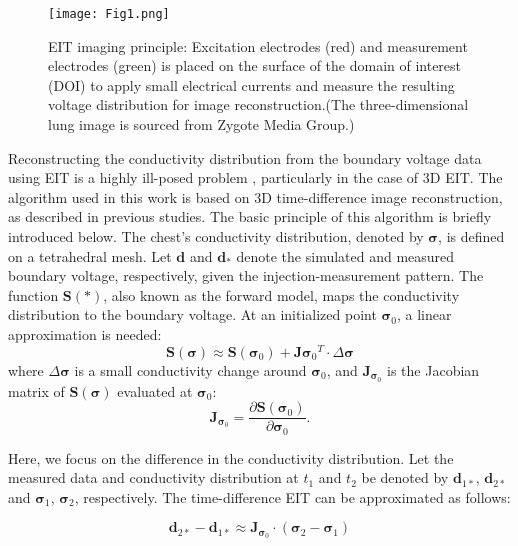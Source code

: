 \documentclass[journal,twoside,web]{ieeecolor}
\begin{document}
\begin{figure}[!h]
	\centering
	\texttt{[image: Fig1.png]}
	\caption{EIT imaging principle: Excitation electrodes (red) and measurement electrodes (green) is placed on the surface of the domain of interest (DOI) to apply small electrical currents and measure the resulting voltage distribution for image reconstruction.(The three-dimensional lung image is sourced from Zygote Media Group.)}
	\label{mea}
\end{figure}
Reconstructing the conductivity distribution from the boundary voltage data using EIT is a highly ill-posed problem \cite{scherzer2010handbook}, particularly in the case of 3D EIT. The algorithm used in this work is based on 3D time-difference image reconstruction, as described in previous studies\cite{zhang2019three,zhang2022deep}. The basic principle of this algorithm is briefly introduced below. The chest's conductivity distribution, denoted by $\bm \sigma$, is defined on a tetrahedral mesh. Let $\bm d$ and $\bm d_* $ denote the simulated and measured boundary voltage, respectively, given the injection-measurement pattern. The function $\bm S(*)$, also known as the forward model, maps the conductivity distribution to the boundary voltage. At an initialized point $\bm \sigma_{0}$, a linear approximation is needed:
\begin{equation}\label{eq1}
	\bm S({\bm \sigma}) \approx \bm S({\bm \sigma_{0}}) + \bm J{\bm \sigma_{0}}^T \cdot \Delta \bm \sigma
\end{equation}
where $\Delta \bm \sigma$ is a small conductivity change around $\bm \sigma_{0}$, and $\bm J_{\bm \sigma_{0}}$ is the Jacobian matrix of $\bm S({\bm \sigma})$ evaluated at $\bm \sigma_{0}$:
\begin{equation}\label{eq2}
	\bm J_{\bm \sigma_{0}} = \frac{\partial \bm S({\bm \sigma _0})}{\partial \bm \sigma _0}.
\end{equation}


Here, we focus on the difference in the conductivity distribution. Let the measured data and conductivity distribution at $t_{1}$ and $t_{2}$ be denoted by $\bm d_{1*}$, $\bm d_{2*}$ and $\bm \sigma_{1}$, $\bm \sigma_{2}$, respectively. The time-difference EIT can be approximated as follows:

\begin{equation}\label{eq3}
	\bm d_{2*}-\bm d_{1*} \approx \bm J_{\bm \sigma _0} \cdot(\bm \sigma_{2}-\bm \sigma_{1})
\end{equation}
\end{document}

